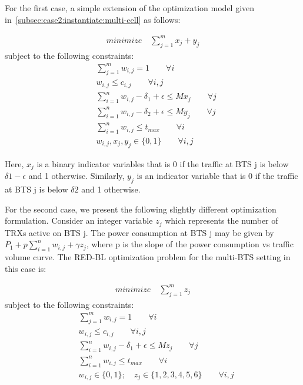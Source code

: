 For the first case, a simple extension of the optimization model given in~\ref{subsec:case2:instantiate:multi-cell} as follows:

\begin{align}
\textit{minimize} \quad \sum_{j=1}^{m} x_j + y_j
\end{align}
subject to the following constraints:
\begin{align}
& \sum_{j=1}^m w_{i,j} = 1 \qquad \forall i \\
& w_{i,j} \leq c_{i,j} \qquad \forall i, j \\
& \sum_{i=1}^nw_{i,j}-\delta_1 +\epsilon \leq Mx_j \qquad \forall j \\
& \sum_{i=1}^nw_{i,j}-\delta_2 +\epsilon \leq My_j \qquad \forall j \\
& \sum_{i=1}^n w_{i,j} \le t_{max} \qquad \forall i \\
& w_{i,j}, x_j, y_j \in \{0,1\} \qquad \forall i, j%
\end{align}

Here, $x_j$ is a binary indicator variables that is 0 if the traffic at BTS j is below $\delta1 - \epsilon$ and 1 otherwise. Similarly, $y_j$ is an indicator variable that is 0 if the traffic at BTS j is below $\delta2$ and 1 otherwise.

For the second case, we present the following slightly different optimization formulation. Consider an integer variable $z_j$ which represents the number of TRXs active on BTS j. The power consumption at BTS j may be given by $P_1 + p \sum_{i=1}^{n} w_{i,j} + \gamma z_j$, where p is the slope of the power consumption vs traffic volume curve. The RED-BL optimization problem for the multi-BTS setting in this case is:

\begin{align}
\textit{minimize} \quad \sum_{j=1}^{m} z_j
\end{align}
subject to the following constraints:
\begin{align}
& \sum_{j=1}^m w_{i,j} = 1 \qquad \forall i \\
& w_{i,j} \leq c_{i,j} \qquad \forall i, j \\
& \sum_{i=1}^nw_{i,j}-\delta_1 +\epsilon \leq Mz_j \qquad \forall j \\
& \sum_{i=1}^n w_{i,j} \le t_{max} \qquad \forall i \\
& w_{i,j} \in \{0,1\}; \quad z_j \in \{1,2,3,4,5,6\}\qquad \forall i, j%
\end{align}

